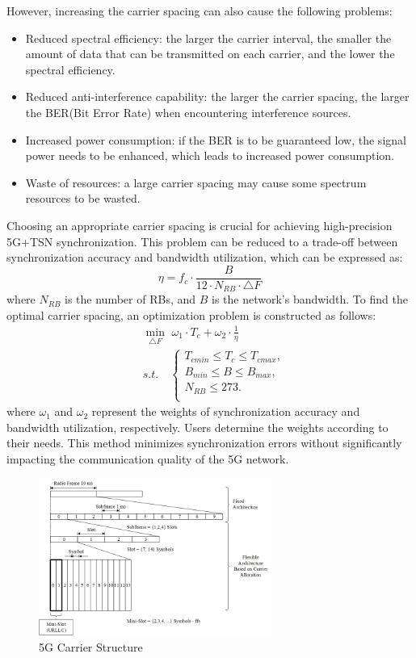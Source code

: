 \documentclass[english]{cccconf}
\begin{document}
However, increasing the carrier spacing can also cause the following problems:
\begin{itemize}
	\item Reduced spectral efficiency: the larger the carrier interval, the smaller the amount of data that can be transmitted on each carrier, and the lower the spectral efficiency.
	
	\item Reduced anti-interference capability: the larger the carrier spacing, the larger the BER(Bit Error Rate) when encountering interference sources.
	
	\item Increased power consumption: if the BER is to be guaranteed low, the signal power needs to be enhanced, which leads to increased power consumption.
	
	\item Waste of resources: a large carrier spacing may cause some spectrum resources to be wasted.
\end{itemize}
Choosing an appropriate carrier spacing is crucial for achieving high-precision 5G+TSN synchronization. This problem can be reduced to a trade-off between synchronization accuracy and bandwidth utilization, which can be expressed as:
\begin{equation}
	\eta=f_c\cdot \frac{B}{12\cdot N_{RB}\cdot \triangle F}
\end{equation}
where $N_{RB}$ is the number of RBs, and $B$ is the network's bandwidth. To find the optimal carrier spacing, an optimization problem is constructed as follows:
\begin{equation}
	\begin{split}
		&\min_{\triangle F} \,\, \omega_1 \cdot T_c+\omega_2 \cdot \frac{1}{\eta} \\
		&s.t.\quad  \left\{\begin{array}{lc}
			T_{cmin}\leq T_c \leq T_{cmax},\\
			B_{min}\leq B \leq B_{max},\\
			N_{RB}\leq 273.\\
		\end{array}\right.
	\end{split}
\end{equation}
where $\omega_1$ and $\omega_2$ represent the weights of synchronization accuracy and bandwidth utilization, respectively. Users determine the weights according to their needs. This method minimizes synchronization errors without significantly impacting the communication quality of the 5G network.
\begin{figure}[htbp]
	\centering
	\setcounter{figure}{4}
	\includegraphics[width=3in]{fig14.png}
	\caption{5G Carrier Structure}
\end{figure}
\end{document}
